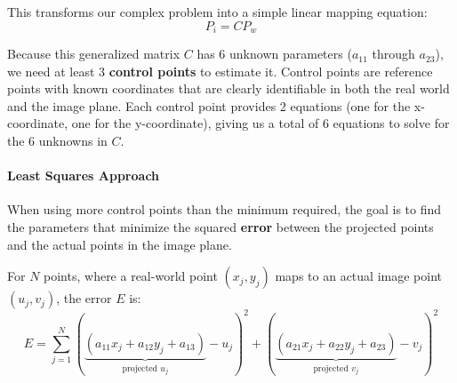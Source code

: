 This transforms our complex problem into a simple linear mapping equation:
$$P_i = C P_w$$

Because this generalized matrix $C$ has 6 unknown parameters ($a_{11}$ through $a_{23}$), we need at least 3 \textbf{control points} to estimate it. 
Control points are reference points with known coordinates that are clearly identifiable in both the real world and the image plane. 
Each control point provides 2 equations (one for the x-coordinate, one for the y-coordinate), giving us a total of 6 equations to solve for the 6 unknowns in $C$.


\paragraph{Least Squares Approach}
When using more control points than the minimum required, the goal is to find the parameters that minimize the squared \textbf{error}
between the projected points and the actual points in the image plane.

For $N$ points, where a real-world point $(x_j, y_j)$ maps to an actual image point $(u_j, v_j)$, the error $E$ is:
$$E = \sum_{j=1}^{N} \left( \underbrace{\left(a_{11} x_j + a_{12} y_j + a_{13}\right)}_{\text{projected } u_j} - u_j \right)^2 + \left( \underbrace{\left(a_{21} x_j + a_{22} y_j + a_{23}\right)}_{\text{projected } v_j} - v_j \right)^2$$

